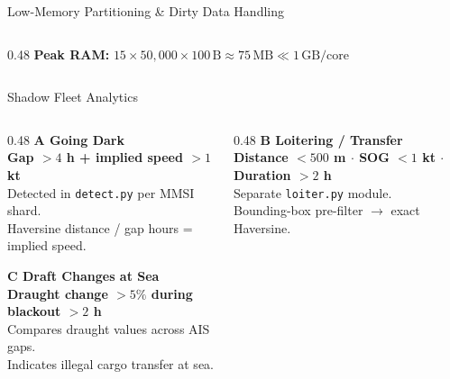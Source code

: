 \documentclass[10pt]{beamer}
\begin{document}
\begin{frame}[t]{Low-Memory Partitioning \& Dirty Data Handling}
\begin{columns}[T, totalwidth=\textwidth]
\begin{column}{0.48\textwidth}
    \vspace{2pt}
    {\footnotesize
    \textbf{Peak RAM:}
    \(15 \times 50{,}000 \times 100\,\text{B} \approx 75\,\text{MB} \ll 1\,\text{GB/core}\)}
  \end{column}

\end{columns}
\end{frame}

\begin{frame}[t]{Shadow Fleet Analytics}


\begin{columns}[T, totalwidth=\textwidth]

  \begin{column}{0.48\textwidth}
    \textbf{\textcolor{anomalyA}{A} \quad Going Dark}\\[2pt]
    {\footnotesize\textcolor{anomalyA}{\textbf{Gap \(> 4\) h + implied speed \(> 1\) kt}}}\\[3pt]
    {\footnotesize
      Detected in \texttt{detect.py} per MMSI shard.\\
      Haversine distance / gap hours = implied speed.
    }

    \vspace{9pt}

    \textbf{\textcolor{anomalyC}{C} \quad Draft Changes at Sea}\\[2pt]
    {\footnotesize\textcolor{anomalyC}{\textbf{Draught change \(> 5\%\) during blackout \(> 2\) h}}}\\[3pt]
    {\footnotesize
      Compares draught values across AIS gaps.\\
      Indicates illegal cargo transfer at sea.
    }
  \end{column}

  \begin{column}{0.48\textwidth}
    \textbf{\textcolor{anomalyB}{B} \quad Loitering / Transfer}\\[2pt]
    {\footnotesize\textcolor{anomalyB}{\textbf{Distance \(< 500\) m \(\cdot\) SOG \(< 1\) kt \(\cdot\) Duration \(> 2\) h}}}\\[3pt]
    {\footnotesize
      Separate \texttt{loiter.py} module.\\
      Bounding-box pre-filter \(\to\) exact Haversine.
    }


\end{column}
\end{columns}
\end{frame}
\end{document}
